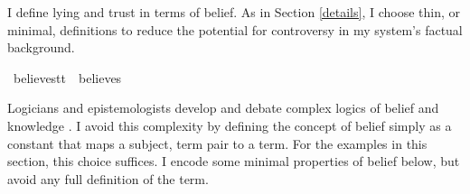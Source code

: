 \begin{isabellebody}
\begin{isamarkuptext}
I define lying and trust in terms of belief. As in Section \ref{details}, I choose thin, or minimal,
definitions to reduce the potential for controversy in my system's factual background.%
\end{isamarkuptext}\isamarkuptrue%
\isamarkupfalse%
\ believe{\isacharcolon}{\isacharcolon}{\isachardoublequoteopen}s{\isasymRightarrow}t{\isasymRightarrow}t{\isachardoublequoteclose}\ {\isacharparenleft}{\isachardoublequoteopen}{\isacharunderscore}\ believes\ {\isacharunderscore}{\isachardoublequoteclose}{\isacharparenright}\isanewline
%
%
\begin{isamarkuptext}%
Logicians and epistemologists develop and debate complex logics of belief and knowledge \citep{seplogicbelief}. 
I avoid this complexity by defining the concept of belief simply as a constant that maps a subject, term pair 
to a term. For the examples in this section, this choice suffices. 
I encode some minimal properties of belief below, but avoid any full definition of the term. 


\end{isamarkuptext}
\end{isabellebody}
